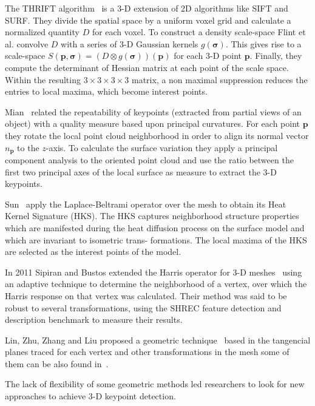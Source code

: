 \documentclass{comjnl}
\begin{document}
The THRIFT algorithm~\cite{THRIFT} is a 3-D extension of 2D algorithms
like SIFT and SURF. They divide the spatial space by a uniform voxel grid
and calculate a normalized quantity $D$ for each voxel. To construct a
density scale-space Flint et al. convolve $D$ with a series of 3-D
Gaussian kernels $g(\bm{\sigma})$. This gives rise to a scale-space
$S(\bm{p},\bm{\sigma}) = (D \otimes g(\bm{\sigma}))(\bm{p})$ for each
3-D point $\bm{p}$. Finally, they compute the determinant of Hessian matrix
at each point of the scale space. Within the resulting $3\times3\times3\times3$
matrix, a non maximal suppression reduces the entries to local maxima, which become
interest points.

Mian~\cite{RepeatabilityAndQuality} related the repeatability of keypoints
(extracted from partial views of an object) with a quality measure based
upon principal curvatures. For each point $\bm{p}$ they rotate
the local point cloud neighborhood in order to align its normal vector $n_{\bm{p}}$
to the $z$-axis. To calculate the surface variation they apply a principal
component analysis to the oriented point cloud and use the ratio between the
first two principal axes of the local surface as measure to extract the 3-D keypoints.

Sun~\cite{Sun01} apply the Laplace-Beltrami operator over
the mesh to obtain its Heat Kernel Signature (HKS). The
HKS captures neighborhood structure properties which
are manifested during the heat diffusion process on the
surface model and which are invariant to isometric trans-
formations. The local maxima of the HKS are selected as
the interest points of the model.

In 2011 Sipiran and Bustos extended the Harris operator for 3-D
meshes~\cite{harris3D} using an adaptive technique to determine the neighborhood
of a vertex, over which the Harris response on that vertex was calculated.
Their method was said to be robust to several transformations, using the SHREC
feature detection and description benchmark to measure their results.

Lin, Zhu, Zhang and Liu proposed a geometric technique~\cite{GMSR} based in the
tangencial planes traced for each vertex and other transformations in the mesh 
some of them can be also found in~\cite{DNN}. 

The lack of flexibility of some geometric methods led researchers to look for
new approaches to achieve 3-D keypoint detection.
\end{document}
